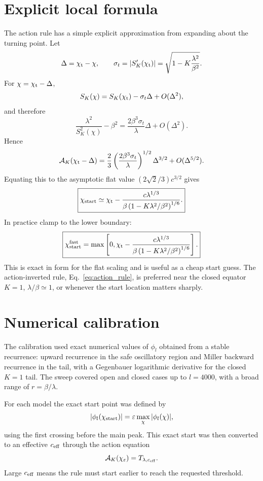 \documentclass[11pt]{article}
\newcommand{\SK}{S_K}
\newcommand{\chip}{\chi_{\rm t}}
\newcommand{\chistart}{\chi_{\rm start}}
\newcommand{\Acal}{\mathcal{A}}
\newcommand{\lam}{\lambda}
\begin{document}
\section{Explicit local formula}

The action rule has a simple explicit approximation from expanding about the
turning point.  Let
\[
  \Delta=\chip-\chi,
  \qquad
  \sigma_t=|\SK'(\chip)|=
  \sqrt{1-K\frac{\lam^2}{\beta^2}}.
\]
For \(\chi=\chip-\Delta\),
\[
  \SK(\chi)=\SK(\chip)-\sigma_t\Delta+O(\Delta^2),
\]
and therefore
\[
  \frac{\lam^2}{\SK^2(\chi)}-\beta^2
  =\frac{2\beta^3\sigma_t}{\lam}\Delta+O(\Delta^2).
\]
Hence
\[
\Acal_K(\chip-\Delta)
=\frac{2}{3}\left(\frac{2\beta^3\sigma_t}{\lam}\right)^{1/2}
\Delta^{3/2}+O(\Delta^{5/2}).
\]
Equating this to the asymptotic flat value
\((2\sqrt2/3)c^{3/2}\) gives
\begin{equation}
\boxed{
\chistart
\simeq
\chip-
\frac{c\lam^{1/3}}
{\beta\left(1-K\lam^2/\beta^2\right)^{1/6}}.
}
\label{eq:explicit_rule}
\end{equation}
In practice clamp to the lower boundary:
\begin{equation}
\boxed{
\chistart^{\rm fast}
=
\max\left[0,
\chip-
\frac{c\lam^{1/3}}
{\beta\left(1-K\lam^2/\beta^2\right)^{1/6}}
\right].
}
\label{eq:fast_rule}
\end{equation}
This is exact in form for the flat scaling and is useful as a cheap start guess.
The action-inverted rule, Eq.~\eqref{eq:action_rule}, is preferred near the
closed equator \(K=1\), \(\lam/\beta\simeq1\), or whenever the start location
matters sharply.

\section{Numerical calibration}

The calibration used exact numerical values of \(\phi_l\) obtained from a stable
recurrence: upward recurrence in the safe oscillatory region and Miller backward
recurrence in the tail, with a Gegenbauer logarithmic derivative for the closed
\(K=1\) tail.  The sweep covered open and closed cases up to \(l=4000\), with a
broad range of \(r=\beta/\lam\).

For each model the exact start point was defined by
\[
  |\phi_l(\chistart)|=\varepsilon\max_\chi |\phi_l(\chi)|,
\]
using the first crossing before the main peak.  This exact start was then
converted to an effective \(c_{\rm eff}\) through the action equation
\[
\Acal_K(\chi_{\varepsilon})=T_{\lam,c_{\rm eff}}.
\]
Large \(c_{\rm eff}\) means the rule must start earlier to reach the requested
threshold.
\end{document}
